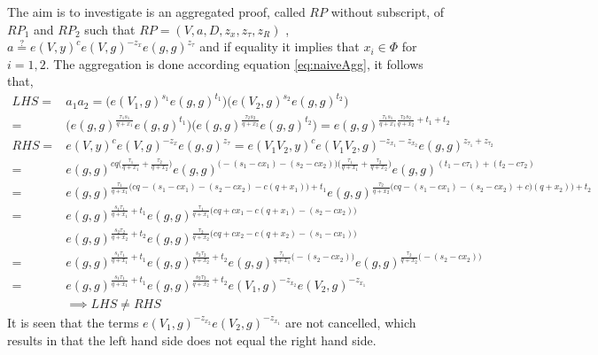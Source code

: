 The aim is to investigate is an aggregated proof, called $RP$ without subscript, of $RP_1$ and $RP_2$ such that $RP=(V,a,D,z_x, z_\tau, z_R)$ ,$a \overset{?}{=} e(V,y)^c e(V,g)^{-z_x}e(g,g)^{z_\tau}$ and if equality it implies that $x_i\in\Phi$ for $i=1,2$. 
The aggregation is done  according equation \eqref{eq:naiveAgg}, it follows that,
\begin{align*}
LHS =& a_1a_2 =\Big( e(V_1,g)^{s_1}e(g,g)^{t_1}   \Big) \Big( e(V_2,g)^{s_2}e(g,g)^{t_2}   \Big)\\
 =&  \Big( e(g,g)^{\frac{\tau_1 s_1}{q+x_1}}e(g,g)^{t_1}   \Big)   \Big( e(g,g)^{\frac{\tau_2 s_2}{q+x_2}}e(g,g)^{t_2}   \Big)  = e(g,g) ^{\frac{\tau_1 s_1}{q+x_1} \frac{\tau_2 s_2}{q+x_2} +t_1+t_2} \\
RHS = &e(V,y)^ce(V,g)^{-z_x}e(g,g)^{z_\tau}  = e(V_1V_2,y)^ce(V_1V_2,g)^{-z_{x_1}- z_{x_2}}e(g,g)^{z_\tau_1+z_\tau_2} \\
=& e(g,g)^{cq \big (  \frac{\tau_1}{q+x_1} + \frac{\tau_2}{q+x_2}\big) } e(g,g)^{ \big(-(s_1- c x_1) - (s_2 - c x_2)  \big) \big (  \frac{\tau_1}{q+x_1} + \frac{\tau_2}{q+x_2}\big) } e(g,g)^{ (t_1- c \tau_1) +(t_2- c \tau_2)} \\
 = & e(g,g)^{ \frac{\tau_1}{q+x_1} \Big(  cq- (s_1-cx_1) -(s_2-cx_2) -c(q+x_1) \Big)+ t_1 }  e(g,g)^{ \frac{\tau_2}{q+x_2} \Big(  cq - (s_1-cx_1)- (s_2-cx_2) + c)(q+x_2) \Big)+ t_2 } \\
 = &  e(g,g)^{ \frac{s_1 \tau_1}{q+x_1}+t_1}  e(g,g)^{ \frac{\tau_1}{q+x_1} \Big(  cq + cx_1 - c(q+x_1) - (s_2-cx_2) \Big) }  \\
 &e(g,g)^{ \frac{s_2 \tau_2}{q+x_2} + t_2  }  e(g,g)^{ \frac{\tau_2}{q+x_2} \Big(  cq + cx_2 - c(q+x_2) - (s_1-cx_1) \Big) } \\
 = &  e(g,g)^{ \frac{s_1 \tau_1}{q+x_1}+t_1} e(g,g)^{ \frac{s_2 \tau_2}{q+x_2}+t_2}   e(g,g)^{ \frac{\tau_1}{q+x_1} \Big(  - (s_2-cx_2) \Big) }   e(g,g)^{ \frac{\tau_2}{q+x_2} \Big( - (s_2-cx_2) \Big) } \\
 = &   e(g,g)^{ \frac{s_1 \tau_1}{q+x_1}+t_1} e(g,g)^{ \frac{s_2 \tau_2}{q+x_2}+t_2}   e(V_1,g)^{- z_{x_2} }   e(V_2,g)^{ - z_{x_1} } \\
 & \implies LHS \neq RHS
\end{align*}
It is seen that the terms $e(V_1,g)^{- z_{x_2} }   e(V_2,g)^{ - z_{x_1} }$ are not cancelled, which results in that the left hand side does not equal the right hand side. 




